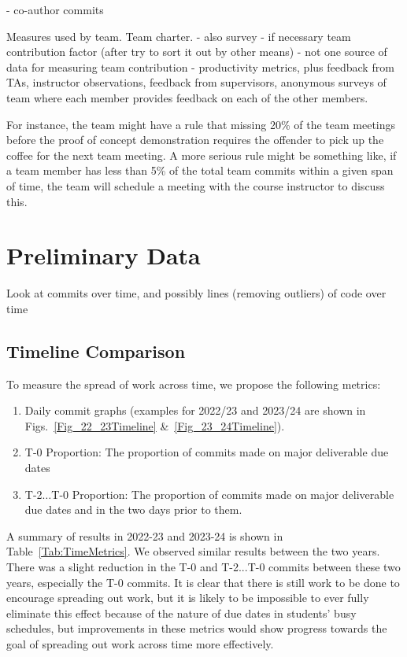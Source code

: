 \documentclass[10pt, conference]{IEEEtran}
\begin{document}
- co-author commits

Measures used by team.  Team charter.  - also survey - if necessary team
contribution factor (after try to sort it out by other means) - not one source
of data for measuring team contribution - productivity metrics, plus feedback
from TAs, instructor observations, feedback from supervisors, anonymous surveys
of team where each member provides feedback on each of the other members.

For instance, the team might have a rule that missing 20\% of the team meetings
before the proof of concept demonstration requires the offender to pick up the
coffee for the next team meeting.  A more serious rule might be something like,
if a team member has less than 5\% of the total team commits within a given span
of time, the team will schedule a meeting with the course instructor to discuss
this.

\section{Preliminary Data} \label{SecPrelimData}

Look at commits over time, and possibly lines (removing outliers) of code over
time

\subsection{Timeline Comparison}

To measure the spread of work across time, we propose the following
metrics:

\begin{enumerate}
\item Daily commit graphs (examples for 2022/23 and 2023/24 are shown in
Figs.~\ref{Fig_22_23Timeline} \&~\ref{Fig_23_24Timeline}).
\item T-0 Proportion: The proportion of commits made on major deliverable due dates
\item T-2$\ldots$T-0 Proportion: The proportion of commits made on major deliverable due
      dates and in the two days prior to them.
\end{enumerate}

A summary of results in 2022-23 and 2023-24 is shown in Table~\ref{Tab:TimeMetrics}.
We observed similar results between the two years. There was a slight reduction in the 
T-0 and T-2...T-0 commits between these two
years, especially the T-0 commits. It is clear that there is still work to be done to
encourage spreading out work, but it is likely to be impossible to ever fully eliminate
this effect because of the nature of due dates in students' busy schedules, but
improvements in these metrics would show progress towards the goal of spreading out
work across time more effectively.
\end{document}
